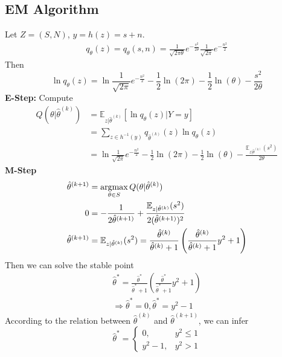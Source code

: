 \documentclass[11pt]{elegantbook}
\newcommand{\argmax}{\operatornamewithlimits{argmax}}
\begin{document}
\subsection{EM Algorithm}
Let $Z=(S,N)$, $y=h(z)=s+n$.
\begin{equation}
    \begin{aligned}
        q_\theta(z)=q_\theta(s,n)=\frac{1}{\sqrt{2\pi\theta}}e^{-\frac{s^2}{2\theta}}\frac{1}{\sqrt{2\pi}}e^{-\frac{n^2}{2}}
    \end{aligned}
    \nonumber
\end{equation}
Then $$\ln q_\theta(z)=\ln \frac{1}{\sqrt{2\pi}}e^{-\frac{n^2}{2}}-\frac{1}{2}\ln (2\pi)-\frac{1}{2}\ln(\theta)-\frac{s^2}{2\theta}$$
\textbf{E-Step:}
        Compute
        \begin{equation}
            \begin{aligned}
                Q(\theta|\hat{\theta}^{(k)})
                &=\mathbb{E}_{z|\hat{\theta}^{(k)}}[\ln q_\theta(z)|Y=y]\\
                &=\sum_{z\in h^{-1}(y)}q_{\hat{\theta}^{(k)}}(z)\ln q_\theta(z)\\
                &=\ln \frac{1}{\sqrt{2\pi}}e^{-\frac{n^2}{2}}-\frac{1}{2}\ln (2\pi)-\frac{1}{2}\ln(\theta)-\frac{\mathbb{E}_{z|\hat{\theta}^{(k)}}(s^2)}{2\theta}
            \end{aligned}
            \nonumber
        \end{equation}
\textbf{M-Step}
\begin{equation}
    \begin{aligned}
        \hat{\theta}^{(k+1)}&=\argmax_{\theta\in S}Q(\theta|\hat{\theta}^{(k)})\\
        0&=-\frac{1}{2\hat{\theta}^{(k+1)}}+\frac{\mathbb{E}_{z|\hat{\theta}^{(k)}}(s^2)}{2(\hat{\theta}^{(k+1)})^2}\\
        \hat{\theta}^{(k+1)}&=\mathbb{E}_{z|\hat{\theta}^{(k)}}(s^2)=\frac{\hat{\theta}^{(k)}}{\hat{\theta}^{(k)}+1}\left(\frac{\hat{\theta}^{(k)}}{\hat{\theta}^{(k)}+1}y^2+1\right)
    \end{aligned}
    \nonumber
\end{equation}
Then we can solve the stable point
\begin{equation}
    \begin{aligned}
        \hat{\theta}^{*}=\frac{\hat{\theta}^{*}}{\hat{\theta}^{*}+1}\left(\frac{\hat{\theta}^{*}}{\hat{\theta}^{*}+1}y^2+1\right)\\
        \Rightarrow \hat{\theta}^{*}=0, \hat{\theta}^{*}=y^2-1
    \end{aligned}
    \nonumber
\end{equation}
According to the relation between $\hat{\theta}^{(k)}$ and $\hat{\theta}^{(k+1)}$, we can infer
$$\hat{\theta}^*=\left\{\begin{matrix}
    0,&y^2\leq 1\\
    y^2-1,&y^2>1
\end{matrix}\right.$$
\end{document}
